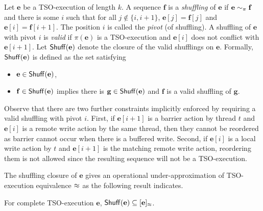 Let $\mathbf{e}$ be a TSO-execution of length $k$.
A sequence $\mathbf{f}$ is a {\em shuffling} of $\mathbf{e}$ if $\mathbf{e}\sim_{\pi}\mathbf{f}$ and there is some $i$ such that for all $j\notin\{i,i+1\}$, $\mathbf{e}[j]=\mathbf{f}[j]$ and $\mathbf{e}[i]=\mathbf{f}[i+1]$.
The position $i$ is called the {\em pivot} (of shuffling).
A shuffling of $\mathbf{e}$ with pivot $i$ is {\em valid} if $\pi(\mathbf{e})$ is a TSO-execution and $\mathbf{e}[i]$ does not conflict with $\mathbf{e}[i+1]$.
Let $\mathsf{Shuff}(\mathbf{e})$ denote the closure of the valid shufflings on $\mathbf{e}$.
Formally, $\mathsf{Shuff}(\mathbf{e})$ is defined as the set satisfying
\begin{itemize}
\item $\mathbf{e}\in\mathsf{Shuff}(\mathbf{e})$,
\item $\mathbf{f}\in\mathsf{Shuff}(\mathbf{e})$ implies there is $\mathbf{g}\in\mathsf{Shuff}(\mathbf{e})$ and $\mathbf{f}$ is a valid shuffling of $\mathbf{g}$.
\end{itemize}

Observe that there are two further constraints implicitly enforced by requiring a valid shuffling with pivot $i$. 
First, if $\mathbf{e}[i+1]$ is a barrier action by thread $t$ and $\mathbf{e}[i]$ is a remote write action by the same thread, then they cannot be reordered as barrier cannot occur when there is a buffered write. 
Second, if $\mathbf{e}[i]$ is a local write action by $t$ and $\mathbf{e}[i+1]$ is the matching remote write action, reordering them is not allowed since the resulting sequence will not be a TSO-execution.

The shuffling closure of $\mathbf{e}$ gives an operational under-approximation of TSO-execution equivalence $\approx$ as the following result indicates.

\begin{proposition}
For complete TSO-execution $\mathbf{e}$, $\mathsf{Shuff}(\mathbf{e}) \subseteq [\mathbf{e}]_{\approx}$.
\end{proposition}


\newcommand{\aliprog}{\ensuremath{\mathtt{prog}}}
\newcommand{\alimem}{\ensuremath{\mathtt{mem}}}
\newcommand{\alimemx}[1]{\ensuremath{\alimem[#1]}}
\newcommand{\alifence}{\ensuremath{\mathtt{fence}}}
\newcommand{\aliassume}{\ensuremath{\mathtt{assume}}\xspace}
\newcommand{\aliassumex}[1]{\ensuremath{\mathtt{assume}\ #1}}
\newcommand{\aliassert}{\ensuremath{\mathtt{assert}}\xspace}
\newcommand{\aliassertx}[1]{\ensuremath{\mathtt{assert}\ #1}}
\newcommand{\alireg}{\ensuremath{\mathtt{r}}}
\newcommand{\aliregx}[1]{\ensuremath{\alireg[#1]}}
\newcommand{\aliif}{\ensuremath{\mathtt{if}}}
\newcommand{\alithen}{\ensuremath{\mathtt{then}}}
\newcommand{\alielse}{\ensuremath{\mathtt{else}}}
\newcommand{\aliifelsex}[3]{\ensuremath{\aliif\ #1\ \alithen\ \{#2\}\ \alielse\ \{#3\}}}
\newcommand{\aliwhile}{\ensuremath{\mathtt{while}}}
\newcommand{\aliwhilex}[2]{\ensuremath{\aliwhile(#1)\ \{#2\}}}
\newcommand{\aliatomic}{\ensuremath{\mathtt{atomic}}}
\newcommand{\aliatomicx}[1]{\ensuremath{\aliatomic\{#1\}}}
\newcommand{\aliskip}{\ensuremath{\mathtt{skip}}}
\newcommand{\alitid}{\ensuremath{\mathtt{tid}}}





